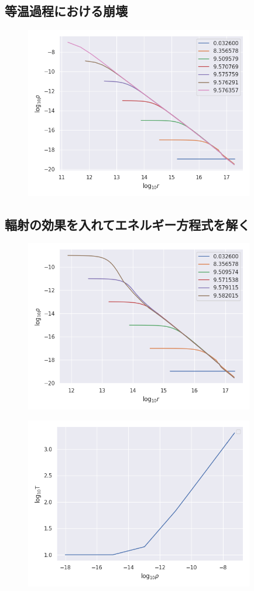 \documentclass[a4j, dvipdfmx]{jsarticle}
\begin{document}
\subsection{等温過程における崩壊}
\begin{figure}[H]
    \includegraphics[clip,width=10.0cm]{graph/rho_r_iso.png}
    \caption{}
    \label{fig:rho_r_iso}
\end{figure}

\subsection{輻射の効果を入れてエネルギー方程式を解く}
\begin{figure}[H]
    \includegraphics[clip,width=10.0cm]{graph/rho_r_noion.png}
    \caption{}
    \label{fig:rho_r_noion}
\end{figure}
\begin{figure}[H]
    \includegraphics[clip,width=10.0cm]{graph/core_noion.png}
    \caption{}
    \label{fig:core_noion}
\end{figure}
\end{document}
